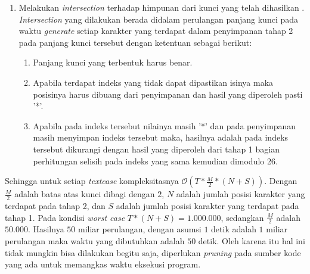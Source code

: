 \begin{enumerate}
	\item Melakukan \textit{intersection} terhadap himpunan dari kunci yang telah dihasilkan  \cite{john_jones_spoj_2009}. \textit{Intersection} yang dilakukan berada didalam perulangan panjang kunci pada waktu \textit{generate} setiap karakter yang terdapat dalam penyimpanan tahap 2 pada panjang kunci tersebut dengan ketentuan sebagai berikut:
	\begin{enumerate}
	\item Panjang kunci yang terbentuk harus benar.
	\item Apabila terdapat indeks yang tidak dapat dipastikan isinya maka posisinya harus dibuang dari penyimpanan dan hasil yang diperoleh pasti '*'.
	\item Apabila \plaintext pada indeks tersebut nilainya masih '*' dan pada penyimpanan masih menyimpan indeks tersebut maka, hasilnya adalah \ciphertext pada indeks tersebut dikurangi dengan hasil yang diperoleh dari tahap 1 bagian perhitungan selisih pada indeks yang sama kemudian dimodulo 26.
	\end{enumerate}
	\end{enumerate}
	Sehingga untuk setiap \textit{textcase} kompleksitasnya 
	$\mathcal{O}(T*\frac{M}{2}*(N+S))$.
	Dengan $\frac{M}{2}$ adalah batas atas kunci dibagi dengan $2$, $N$ adalah jumlah posisi karakter yang terdapat pada tahap 2, dan $S$ adalah jumlah posisi karakter yang terdapat pada tahap 1. Pada kondisi \textit{worst case} $T*(N+S)=1.000.000$, sedangkan $\frac{M}{2}$ adalah $50.000$. Hasilnya $50$ miliar perulangan, dengan asumsi $1$ detik adalah $1$ miliar perulangan maka waktu yang dibutuhkan adalah $50$ detik. Oleh karena itu hal ini tidak mungkin bisa dilakukan begitu saja, diperlukan \textit{pruning} pada sumber kode yang ada untuk memangkas waktu eksekusi program.